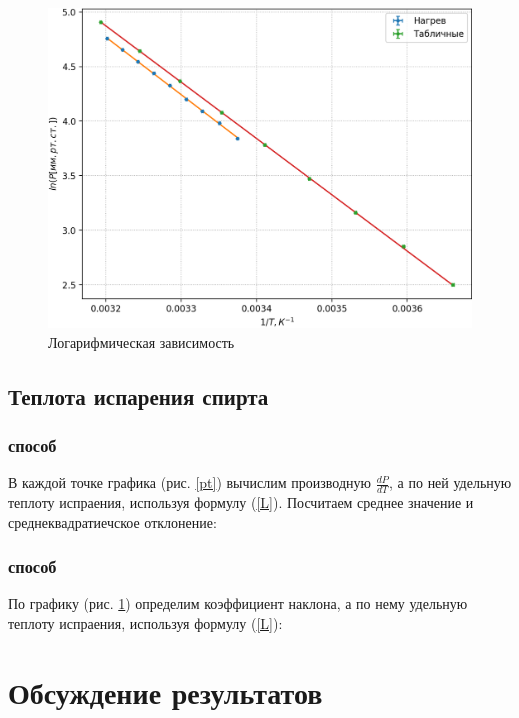 \documentclass[a4paper,12pt]{article} %
\begin{document}
\begin{figure}[h!]
\begin{center}
\includegraphics[width=1\textwidth]{lnP(T^-1).png}
\caption{Логарифмическая зависимость}\label{lnpt}
\end{center}
\end{figure}

\subsection*{Теплота испарения спирта}

\subsubsection*{ способ}

В каждой точке графика (рис. \ref{pt}) вычислим производную $\frac{dP}{dT}$, а по ней удельную теплоту испраения, используя формулу (\ref{L}). Посчитаем среднее значение и среднеквадратиечское отклонение:
\begin{equation}\label{L1h}
    
\end{equation}
\begin{equation}\label{L1t}
    
\end{equation}

\subsubsection*{ способ}

По графику (рис. \ref{lnpt}) определим коэффициент наклона, а по нему удельную теплоту испраения, используя формулу (\ref{L}):
\begin{equation}\label{L2h}
    
\end{equation}
\begin{equation}\label{L2t}
    
\end{equation}

\section{Обсуждение результатов}
\end{document}
